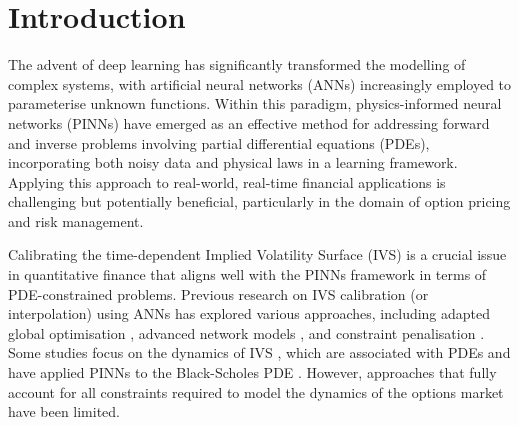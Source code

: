 \documentclass[sigconf, authorversion=true, nonacm=true]{acmart}
\begin{document}


\maketitle

\section{Introduction}
The advent of deep learning has significantly transformed the modelling of complex systems, with artificial neural networks (ANNs) increasingly employed to parameterise unknown functions. Within this paradigm, physics-informed neural networks (PINNs) \cite{raissi2019physics} have emerged as an effective method for addressing forward and inverse problems involving partial differential equations (PDEs), incorporating both noisy data and physical laws in a learning framework. Applying this approach to real-world, real-time financial applications is challenging but potentially beneficial, particularly in the domain of option pricing and risk management.

Calibrating the time-dependent Implied Volatility Surface (IVS) is a crucial issue in quantitative finance that aligns well with the PINNs framework in terms of PDE-constrained problems. Previous research on IVS calibration (or interpolation) using ANNs has explored various approaches, including adapted global optimisation \cite{liu2019neural, choudhary2023funvol, cohen2023arbitrage}, advanced network models \cite{bergeron2022variational, cao2021option, cont2022simulation, ning2023arbitrage}, and constraint penalisation \cite{itkin2019deep, ackerer2020deep, choudhary2023funvol, cont2022simulation}. Some studies focus on the dynamics of IVS \cite{cont2002dynamics, balland2002deterministicimplied}, which are associated with PDEs and have applied PINNs to the Black-Scholes PDE \cite{bai2022application, dhiman2023physics}. However, approaches that fully account for all constraints required to model the dynamics of the options market have been limited.
\end{document}
